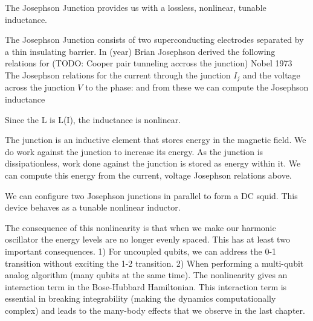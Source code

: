 The Josephson Junction provides us with a lossless, nonlinear, tunable inductance.

The Josephson Junction consists of two superconducting electrodes separated by a thin insulating barrier.
In (year) Brian Josephson derived the following relations for (TODO: Cooper pair tunneling accross the junction)
Nobel 1973
The Josephson relations for the current through the junction $I_j$ and the voltage across the junction $V$ to the phase:
and
from these we can compute the Josephson inductance

Since the L is L(I), the inductance is nonlinear.

The junction is an inductive element that stores energy in the magnetic field.  We do work against the junction to increase its energy.
As the junction is dissipationless, work done against the junction is stored as energy within it.
We can compute this energy from the current, voltage Josephson relations above.

We can configure two Josephson junctions in parallel to form a DC squid.
This device behaves as a tunable nonlinear inductor.

The consequence of this nonlinearity is that when we make our harmonic oscillator the energy levels are no longer evenly spaced.
This has at least two important consequences.
1) For uncoupled qubits, we can address the 0-1 transition without exciting the 1-2 transition.
2) When performing a multi-qubit analog algorithm (many qubits at the same time).
The nonlinearity gives an interaction term in the Bose-Hubbard Hamiltonian.
This interaction term is essential in breaking integrability (making the dynamics computationally complex) and leads to the many-body effects that we observe in the last chapter.


